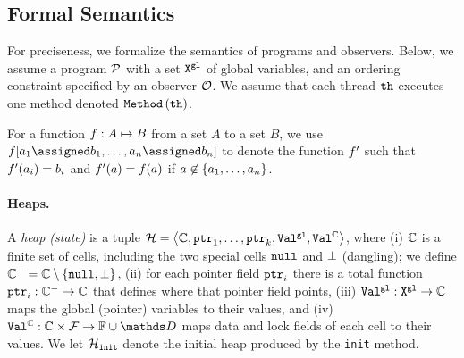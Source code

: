 
\subsection{Formal Semantics}
\label{semantics:section}
For preciseness, we formalize the semantics of programs and
observers. Below, we assume a program ${\mathcal P}$  with a set 
${\tt X}^{\tt gl}$ of global variables, and an ordering constraint
specified by an observer ${\mathcal O}$.
%
We assume that each thread ${\tt th}$ executes one method
denoted ${\tt Method}\left({\tt th}\right)$.

For a function $f:A\mapsto B$ from a set $A$ to
a set $B$, we use 
$\fun[\aelem_1\assigned\belem_1,\ldots,\aelem_\nn\assigned\belem_\nn]$ 
to denote the function
$f'$ such that $f'(a_i)=b_i$ and 
$f'(a)=f(a)$ if 
$a\not\in\left\{a_1,\ldots,a_n\right\}$.
%

%


\paragraph{Heaps.}
A {\it heap (state)} is a tuple ${\mathcal H}=\left\langle{\mathbb C},\mathtt{ptr}_1, \ldots , \mathtt{ptr}_k,{\tt Val}^{\tt gl},{\tt Val}^{{\mathbb C}}\right\rangle$, where
(i)
${\mathbb C}$ is a finite set of cells, including the two special cells
${\tt null}$ and $\bot$ (dangling);
%
we define ${\mathbb C}^{-}={\mathbb C}\setminus\left\{{\tt null},\bot\right\}$,
%
(ii)
for each pointer field $\mathtt{ptr}_i$ there is a total function
$\mathtt{ptr}_i:{\mathbb C}^{-}\to{\mathbb C}$
that defines where that pointer field points,
(iii)
${\tt Val}^{\tt gl}:{\tt X}^{\tt gl}\to{\mathbb C}$ maps the global (pointer)
variables to their values, and
(iv)
$\cellval:\cellset\times\fieldset\to\fset\cup\ddomain$
maps data and lock fields of each cell to their values.
%
We let ${\mathcal H}_{\tt init}$ denote the initial heap produced by the
{\tt init} method.

